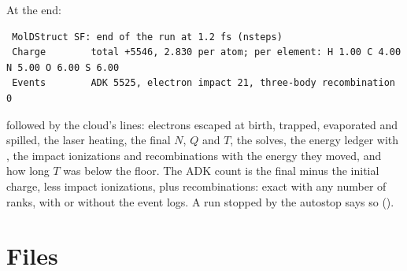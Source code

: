 At the end:
\begin{lstlisting}
 MolDStruct SF: end of the run at 1.2 fs (nsteps)
 Charge        total +5546, 2.830 per atom; per element: H 1.00 C 4.00 N 5.00 O 6.00 S 6.00
 Events        ADK 5525, electron impact 21, three-body recombination 0
\end{lstlisting}
followed by the cloud's lines: electrons escaped at birth, trapped, evaporated and spilled, the laser heating, the final
$N$, $Q$ and $T$, the solves, the energy ledger with , the impact ionizations and recombinations with the
energy they moved, and how long $T$ was below the floor.
The ADK count is the final minus the initial charge, less impact ionizations, plus recombinations: exact with any number
of ranks, with or without the event logs.
A run stopped by the autostop says so ().

\section{Files}

